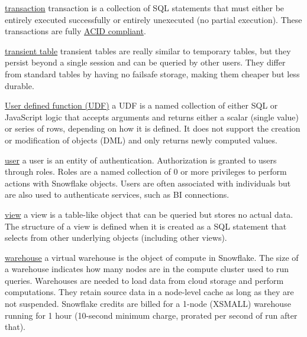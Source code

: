 \documentclass[9pt]{innovativeinnovation-cheatsheet}
\begin{document}
\begin{multicols}{3}
      \item \href{https://docs.snowflake.net/manuals/sql-reference/transactions.html}{transaction}  transaction is a collection of SQL statements that must either be entirely executed successfully or entirely unexecuted (no partial execution). These transactions are fully \href{https://en.wikipedia.org/wiki/ACID}{ACID compliant}.
      
      \item \href{https://docs.snowflake.net/manuals/user-guide/tables-temp-transient.html#transient-tables}{transient table}  transient tables are really similar to temporary tables, but they persist beyond a single session and can be queried by other users. They differ from standard tables by having no failsafe storage, making them cheaper but less durable.
      
      \item \href{https://docs.snowflake.net/manuals/sql-reference/udf-overview.html}{User defined function (UDF)}  a UDF is a named collection of either SQL or JavaScript logic that accepts arguments and returns either a scalar (single value) or series of rows, depending on how it is defined. It does not support the creation or modification of objects (DML) and only returns newly computed values.
      
      \item \href{https://docs.snowflake.net/manuals/user-guide/admin-user-management.html}{user}  a user is an entity of authentication. Authorization is granted to users through roles. Roles are a named collection of 0 or more privileges to perform actions with Snowflake objects. Users are often associated with individuals but are also used to authenticate services, such as BI connections.
      
      \item \href{https://docs.snowflake.net/manuals/user-guide/views-introduction.html}{view}  a view is a table-like object that can be queried but stores no actual data. The structure of a view is defined when it is created as a SQL statement that selects from other underlying objects (including other views).
      
      \item \href{https://docs.snowflake.net/manuals/user-guide/warehouses-overview.html}{warehouse}  a virtual warehouse is the object of compute in Snowflake. The size of a warehouse indicates how many nodes are in the compute cluster used to run queries. Warehouses are needed to load data from cloud storage and perform computations. They retain source data in a node-level cache as long as they are not suspended. Snowflake credits are billed for a 1-node (XSMALL) warehouse running for 1 hour (10-second minimum charge, prorated per second of run after that).
      

\end{multicols}
\end{document}
